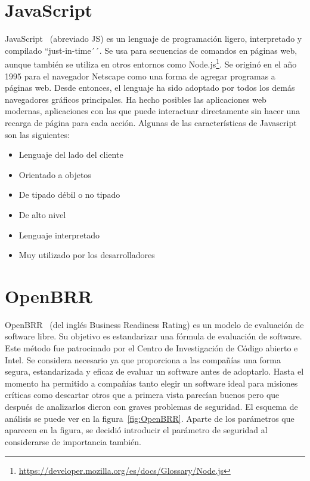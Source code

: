 \documentclass[a4paper, 12pt]{book}
\begin{document}
\section{JavaScript}
\label{sec:Javascript}
JavaScript~\cite{website:Javascript} (abreviado JS) es un lenguaje de programación ligero, interpretado y compilado ``just-in-time´´. Se usa para secuencias de comandos en páginas web, aunque también se utiliza en otros entornos como Node.js\footnote{\url{https://developer.mozilla.org/es/docs/Glossary/Node.js}}.
Se originó en el año 1995 para el navegador Netscape como una forma de agregar programas a páginas web. Desde entonces, el lenguaje ha sido adoptado por todos los demás navegadores gráficos principales. Ha hecho posibles las aplicaciones web modernas, aplicaciones con las que puede interactuar directamente sin hacer una recarga de página para cada acción.
Algunas de las características de Javascript son las siguientes:
\begin{itemize}
	\item Lenguaje del lado del cliente
	\item Orientado a objetos
	\item De tipado débil o no tipado
	\item De alto nivel
	\item Lenguaje interpretado
	\item Muy utilizado por los desarrolladores\\
\end{itemize}
\section{OpenBRR}
\label{sec:openbrr}
OpenBRR~\cite{website:OpenBRR} (del inglés Business Readiness Rating) es un modelo de evaluación de software libre. Su objetivo es estandarizar una fórmula de evaluación de software. Este método fue patrocinado por el Centro de Investigación de Código abierto e Intel.
Se considera necesario ya que proporciona a las compañías una forma segura, estandarizada y eficaz de evaluar un software antes de adoptarlo. Hasta el momento ha permitido a compañías tanto elegir un software ideal para misiones críticas como descartar otros que a primera vista parecían buenos pero que después de analizarlos dieron con graves problemas de seguridad.
El esquema de análisis se puede ver en la figura~\ref{fig:OpenBRR}. Aparte de los parámetros que aparecen en la figura, se decidió introducir el parámetro de seguridad al considerarse de importancia también.
\end{document}
